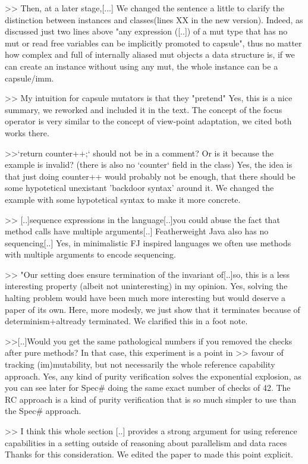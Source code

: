 >> Then, at a later stage,[...]
We changed the sentence a little to clarify the distinction between instances and classes(lines XX in the new version). Indeed, as discussed just two lines above
"any expression ([..]) of a mut type that has no mut or read free variables can be implicitly promoted to capsule",
thus no matter how complex and full of internally aliased mut objects a data structure is, if we can create an instance without using any mut, the whole instance can be a capsule/imm.


>> My intuition for capsule mutators is that they "pretend"
Yes, this is a nice summary, we reworked and included it in the text. 
The concept of the focus operator is very similar to the concept of view-point adaptation, we cited both works there.


>>`return counter++;` should not be in a comment? Or is it because the example is invalid? (there is also no `counter` field in the class)
Yes, the idea is that just doing counter++ would probably not be enough, that there should be some hypotetical unexistant 'backdoor syntax' around it.
We changed the example with some hypotetical syntax to make it more concrete.

>> [..]sequence expressions in the language[..]you could abuse the fact that method calls have multiple arguments[..]  Featherweight Java also has no sequencing[..]
Yes, in minimalistic FJ inspired languages we often use methods with multiple arguments to encode sequencing.


>> "Our setting does ensure termination of the invariant of[..]so, this is a less  interesting property (albeit not uninteresting) in my opinion.
Yes, solving the halting problem would have been much more interesting but would deserve a paper of its own.
Here, more modesly, we just show that it terminates because of determinism+altready terminated.
We clarified this in a foot note.


>>[..]Would you get the same pathological numbers if you removed the checks after pure methods? In that case, this experiment is a point in
>> favour of tracking (im)mutability, but not necessarily the whole reference capability approach.
Yes, any kind of purity verification solves the exponential explosion, as you can see later for Spec# doing the same exact number of checks of 42.
The RC approach is a kind of purity verification that is so much simpler to use than the Spec# approach.

>> I think this whole section [..] provides a strong argument for using reference capabilities in a setting outside of reasoning about parallelism and data races
Thanks for this consideration. We edited the paper to made this point explicit.


